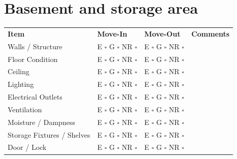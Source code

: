 
\section*{Basement and storage area}
\label{sec:basement}

\begin{longtable}{p{6cm} p{3cm} p{3cm} p{4cm}}
\textbf{Item} & \textbf{Move-In} & \textbf{Move-Out} & \textbf{Comments} \\
Walls / Structure & E $\square$ G $\square$ NR $\square$ & E $\square$ G $\square$ NR $\square$ & \\
Floor Condition & E $\square$ G $\square$ NR $\square$ & E $\square$ G $\square$ NR $\square$ & \\
Ceiling & E $\square$ G $\square$ NR $\square$ & E $\square$ G $\square$ NR $\square$ & \\
Lighting & E $\square$ G $\square$ NR $\square$ & E $\square$ G $\square$ NR $\square$ & \\
Electrical Outlets & E $\square$ G $\square$ NR $\square$ & E $\square$ G $\square$ NR $\square$ & \\
Ventilation & E $\square$ G $\square$ NR $\square$ & E $\square$ G $\square$ NR $\square$ & \\
Moisture / Dampness & E $\square$ G $\square$ NR $\square$ & E $\square$ G $\square$ NR $\square$ & \\
Storage Fixtures / Shelves & E $\square$ G $\square$ NR $\square$ & E $\square$ G $\square$ NR $\square$ & \\
Door / Lock & E $\square$ G $\square$ NR $\square$ & E $\square$ G $\square$ NR $\square$ & \\
\end{longtable}

